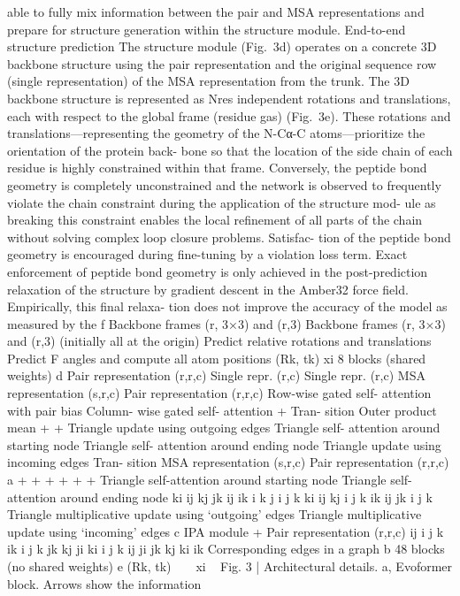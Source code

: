 able to fully mix information between the pair and MSA representations
and prepare for structure generation within the structure module.
End-to-end structure prediction
The structure module (Fig. 3d) operates on a concrete 3D backbone
structure using the pair representation and the original sequence row
(single representation) of the MSA representation from the trunk. The
3D backbone structure is represented as Nres independent rotations
and translations, each with respect to the global frame (residue gas)
(Fig. 3e). These rotations and translations—representing the geometry
of the N-Cα-C atoms—prioritize the orientation of the protein back-
bone so that the location of the side chain of each residue is highly
constrained within that frame. Conversely, the peptide bond geometry
is completely unconstrained and the network is observed to frequently
violate the chain constraint during the application of the structure mod-
ule as breaking this constraint enables the local refinement of all parts
of the chain without solving complex loop closure problems. Satisfac-
tion of the peptide bond geometry is encouraged during fine-tuning
by a violation loss term. Exact enforcement of peptide bond geometry
is only achieved in the post-prediction relaxation of the structure by
gradient descent in the Amber32 force field. Empirically, this final relaxa-
tion does not improve the accuracy of the model as measured by the
f
Backbone frames
(r, 3×3) and (r,3)
Backbone frames
(r, 3×3) and (r,3)
(initially all at the origin)
Predict relative
rotations and
translations
Predict F angles
and compute all
atom positions
(Rk, tk)
xi
8 blocks (shared weights)
d
Pair
representation
(r,r,c)
Single repr. (r,c)
Single repr. (r,c)
MSA
representation
(s,r,c)
Pair
representation
(r,r,c)
Row-wise
gated
self-
attention
with pair
bias
Column-
wise
gated
self-
attention
+
Tran-
sition
Outer
product
mean
+
+
Triangle
update
using
outgoing
edges
Triangle
self-
attention
around
starting
node
Triangle
self-
attention
around
ending
node
Triangle
update
using
incoming
edges
Tran-
sition
MSA
representation
(s,r,c)
Pair
representation
(r,r,c)
a
+
+
+
+
+
+
Triangle self-attention around
starting node
Triangle self-attention around
ending node
ki
ij
kj
jk
ij
ik
i
k
j
i
j
k
ki
ij
kj
i
j
k
ik
ij
jk
i
j
k
Triangle multiplicative update
using ‘outgoing’ edges
Triangle multiplicative update
using ‘incoming’ edges
c
IPA
module
+
Pair representation
(r,r,c)
ij
i
j
k
ik
i
j
k
jk
kj
ji
ki
i
j
k
ij
ji
jk
kj
ki
ik
Corresponding edges
in a graph
b
48 blocks (no shared weights)
e
(Rk, tk)
~
~
xi
~
Fig. 3 | Architectural details. a, Evoformer block. Arrows show the information
